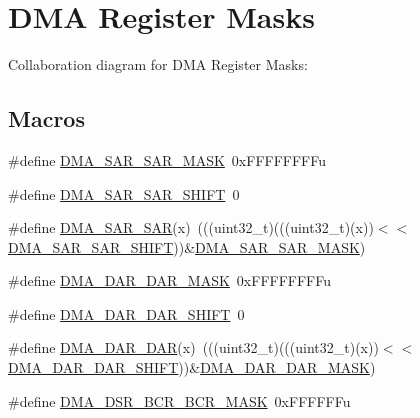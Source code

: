 \hypertarget{group___d_m_a___register___masks}{}\section{D\+MA Register Masks}
\label{group___d_m_a___register___masks}
Collaboration diagram for D\+MA Register Masks\+:
\subsection*{Macros}
\begin{DoxyCompactItemize}
\item 
\#define \hyperlink{group___d_m_a___register___masks_ga990e3ca99cc1d75f5942432959953048}{D\+M\+A\+\_\+\+S\+A\+R\+\_\+\+S\+A\+R\+\_\+\+M\+A\+SK}~0x\+F\+F\+F\+F\+F\+F\+F\+Fu
\item 
\#define \hyperlink{group___d_m_a___register___masks_ga869308e6de564860ede4d607b19bce31}{D\+M\+A\+\_\+\+S\+A\+R\+\_\+\+S\+A\+R\+\_\+\+S\+H\+I\+FT}~0
\item 
\#define \hyperlink{group___d_m_a___register___masks_ga68e0d9de2ef332cbd1a302d177a29848}{D\+M\+A\+\_\+\+S\+A\+R\+\_\+\+S\+AR}(x)~(((uint32\+\_\+t)(((uint32\+\_\+t)(x))$<$$<$\hyperlink{group___d_m_a___register___masks_ga869308e6de564860ede4d607b19bce31}{D\+M\+A\+\_\+\+S\+A\+R\+\_\+\+S\+A\+R\+\_\+\+S\+H\+I\+FT}))\&\hyperlink{group___d_m_a___register___masks_ga990e3ca99cc1d75f5942432959953048}{D\+M\+A\+\_\+\+S\+A\+R\+\_\+\+S\+A\+R\+\_\+\+M\+A\+SK})
\item 
\#define \hyperlink{group___d_m_a___register___masks_gad24e68800bcb03e0d2ffad9b026d5c28}{D\+M\+A\+\_\+\+D\+A\+R\+\_\+\+D\+A\+R\+\_\+\+M\+A\+SK}~0x\+F\+F\+F\+F\+F\+F\+F\+Fu
\item 
\#define \hyperlink{group___d_m_a___register___masks_ga6dc575769385f559893116dabe37a002}{D\+M\+A\+\_\+\+D\+A\+R\+\_\+\+D\+A\+R\+\_\+\+S\+H\+I\+FT}~0
\item 
\#define \hyperlink{group___d_m_a___register___masks_ga61f5171a3627441884096a69a3f33ca5}{D\+M\+A\+\_\+\+D\+A\+R\+\_\+\+D\+AR}(x)~(((uint32\+\_\+t)(((uint32\+\_\+t)(x))$<$$<$\hyperlink{group___d_m_a___register___masks_ga6dc575769385f559893116dabe37a002}{D\+M\+A\+\_\+\+D\+A\+R\+\_\+\+D\+A\+R\+\_\+\+S\+H\+I\+FT}))\&\hyperlink{group___d_m_a___register___masks_gad24e68800bcb03e0d2ffad9b026d5c28}{D\+M\+A\+\_\+\+D\+A\+R\+\_\+\+D\+A\+R\+\_\+\+M\+A\+SK})
\item 
\#define \hyperlink{group___d_m_a___register___masks_ga51f1a407dbca889f0b21bb1eeaa1c5d0}{D\+M\+A\+\_\+\+D\+S\+R\+\_\+\+B\+C\+R\+\_\+\+B\+C\+R\+\_\+\+M\+A\+SK}~0x\+F\+F\+F\+F\+F\+Fu

\end{DoxyCompactItemize}
